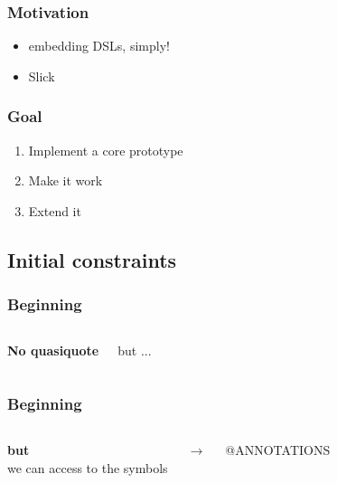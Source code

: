 \documentclass{beamer}
\begin{document}

\begin{frame}
\frametitle{Motivation}
\begin{itemize}
\item embedding DSLs, simply!
\item Slick
\end{itemize}
\end{frame}


\begin{frame}
\frametitle{Goal}
\begin{enumerate}
\item Implement a core prototype
\item Make it work
\item Extend it
\end{enumerate}
\end{frame}

\subsection{Initial constraints}

\begin{frame}
\frametitle{Beginning}
\begin{columns}[c] %

\textbf{No quasiquote}

but ...
\end{columns}
\end{frame}

\begin{frame}
\frametitle{Beginning}
\begin{columns}[c] %

\textbf{but}\\
we can access to the symbols 

$\rightarrow$

@ANNOTATIONS
\end{columns}
\end{frame}
\end{document}
